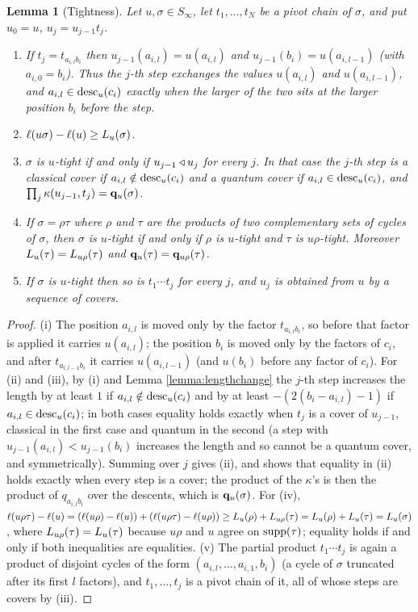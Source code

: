 \documentclass{amsart}
\newtheorem{lemma}{Lemma}[section]
\theoremstyle{definition}
\theoremstyle{remark}
\numberwithin{equation}{section}
\begin{document}
\begin{lemma}[Tightness] \label{lemma:tight}
Let $u,\sigma\in S_\infty$, let $t_1,\ldots,t_N$ be a pivot chain of $\sigma$, and put $u_0=u$, $u_j=u_{j-1}t_j$.
\begin{enumerate}
\item[(i)] If $t_j=t_{a_{i,l}b_i}$ then $u_{j-1}(a_{i,l})=u(a_{i,l})$ and $u_{j-1}(b_i)=u(a_{i,l-1})$ (with $a_{i,0}=b_i$). Thus the $j$-th step exchanges the values $u(a_{i,l})$ and $u(a_{i,l-1})$, and $a_{i,l}\in\mathrm{desc}_u(c_i)$ exactly when the larger of the two sits at the larger position $b_i$ before the step.
\item[(ii)] $\ell(u\sigma)-\ell(u)\geq L_u(\sigma)$.
\item[(iii)] $\sigma$ is $u$-tight if and only if $u_{j-1}\triangleleft u_j$ for every $j$. In that case the $j$-th step is a classical cover if $a_{i,l}\notin\mathrm{desc}_u(c_i)$ and a quantum cover if $a_{i,l}\in\mathrm{desc}_u(c_i)$, and $\prod_j\kappa(u_{j-1},t_j)=\mathbf{q}_u(\sigma)$.
\item[(iv)] If $\sigma=\rho\tau$ where $\rho$ and $\tau$ are the products of two complementary sets of cycles of $\sigma$, then $\sigma$ is $u$-tight if and only if $\rho$ is $u$-tight and $\tau$ is $u\rho$-tight. Moreover $L_u(\tau)=L_{u\rho}(\tau)$ and $\mathbf{q}_u(\tau)=\mathbf{q}_{u\rho}(\tau)$.
\item[(v)] If $\sigma$ is $u$-tight then so is $t_1\cdots t_j$ for every $j$, and $u_j$ is obtained from $u$ by a sequence of covers.
\end{enumerate}
\end{lemma}
\begin{proof}
(i) The position $a_{i,l}$ is moved only by the factor $t_{a_{i,l}b_i}$, so before that factor is applied it carries $u(a_{i,l})$; the position $b_i$ is moved only by the factors of $c_i$, and after $t_{a_{i,l-1}b_i}$ it carries $u(a_{i,l-1})$ (and $u(b_i)$ before any factor of $c_i$). For (ii) and (iii), by (i) and Lemma \ref{lemma:lengthchange} the $j$-th step increases the length by at least $1$ if $a_{i,l}\notin\mathrm{desc}_u(c_i)$ and by at least $-(2(b_i-a_{i,l})-1)$ if $a_{i,l}\in\mathrm{desc}_u(c_i)$; in both cases equality holds exactly when $t_j$ is a cover of $u_{j-1}$, classical in the first case and quantum in the second (a step with $u_{j-1}(a_{i,l})<u_{j-1}(b_i)$ increases the length and so cannot be a quantum cover, and symmetrically). Summing over $j$ gives (ii), and shows that equality in (ii) holds exactly when every step is a cover; the product of the $\kappa$'s is then the product of $q_{a_{i,l}b_i}$ over the descents, which is $\mathbf{q}_u(\sigma)$. For (iv), $\ell(u\rho\tau)-\ell(u)=(\ell(u\rho)-\ell(u))+(\ell(u\rho\tau)-\ell(u\rho))\geq L_u(\rho)+L_{u\rho}(\tau)=L_u(\rho)+L_u(\tau)=L_u(\sigma)$, where $L_{u\rho}(\tau)=L_u(\tau)$ because $u\rho$ and $u$ agree on $\mathrm{supp}(\tau)$; equality holds if and only if both inequalities are equalities. (v) The partial product $t_1\cdots t_j$ is again a product of disjoint cycles of the form $(a_{i,l},\ldots,a_{i,1},b_i)$ (a cycle of $\sigma$ truncated after its first $l$ factors), and $t_1,\ldots,t_j$ is a pivot chain of it, all of whose steps are covers by (iii).
\end{proof}
\end{document}
